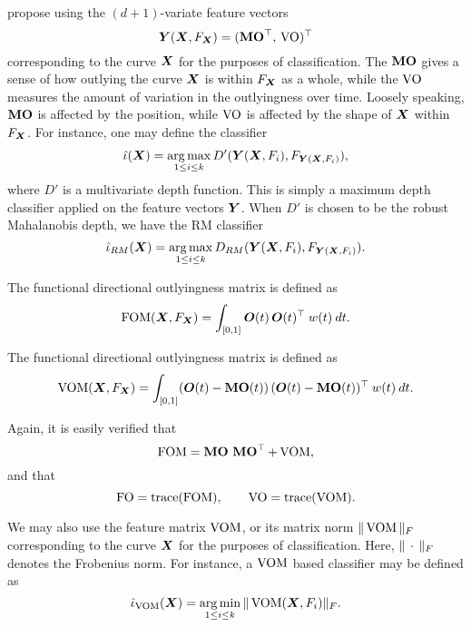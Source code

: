 \textcite{dai-genton-2018} propose using the $(d + 1)$-variate feature vectors
\begin{equation}
    \bm{Y}(\bm{X}, F_{\bm{X}}) = (\operatorname{\textbf{MO}}^\top,\, \operatorname{VO})^\top
\end{equation}
corresponding to the curve $\bm{X}$ for the purposes of classification.
The $\operatorname{\textbf{MO}}$ gives a sense of how outlying the curve $\bm{X}$ is within $F_{\bm{X}}$ as
a whole, while the $\operatorname{VO}$ measures the amount of variation in the outlyingness
over time.
Loosely speaking, $\operatorname{\textbf{MO}}$ is affected by the position, while $\operatorname{VO}$ is affected
by the shape of $\bm{X}$ within $F_{\bm{X}}$.
For instance, one may define the classifier
\begin{equation}
    \hat{\iota}(\bm{X}) = \operatorname*{arg\,max}_{1 \leq i \leq k} D'(\bm{Y}(\bm{X}, F_i), F_{\bm{Y}(\bm{X}, F_i)}),
\end{equation}
where $D'$ is a multivariate depth function.
This is simply a maximum depth classifier applied on the feature vectors
$\bm{Y}$.
When $D'$ is chosen to be the robust Mahalanobis depth, we have the RM
classifier
\begin{equation}
    \hat{\iota}_{RM}(\bm{X}) = \operatorname*{arg\,max}_{1 \leq i \leq k} D_{RM}(\bm{Y}(\bm{X}, F_i), F_{\bm{Y}(\bm{X}, F_i)}).
\end{equation}


\begin{definition}
    The functional directional outlyingness matrix is defined as
    \begin{equation}
        \operatorname{FOM}(\bm{X}, F_{\bm{X}}) = \int_{[0, 1]} \bm{O}(t)\,\bm{O}(t)^\top \:w(t)\:dt.
    \end{equation}
\end{definition}

\begin{definition}
    The functional directional outlyingness matrix is defined as
    \begin{equation}
        \operatorname{VOM}(\bm{X}, F_{\bm{X}}) = \int_{[0, 1]} (\bm{O}(t) - \operatorname{\textbf{MO}}(t))\,(\bm{O}(t) - \operatorname{\textbf{MO}}(t))^\top \:w(t)\:dt.
    \end{equation}
\end{definition}

Again, it is easily verified that
\begin{equation}
    \operatorname{FOM} = \operatorname{\textbf{MO}}\,\operatorname{\textbf{MO}}^\top + \operatorname{VOM},
\end{equation}
and that
\begin{equation}
    \operatorname{FO} = \operatorname{trace}(\operatorname{FOM}), \qquad
    \operatorname{VO} = \operatorname{trace}(\operatorname{VOM}).
\end{equation}

We may also use the feature matrix $\operatorname{VOM}$, or its matrix norm $\Vert \operatorname{VOM} \Vert_F$
corresponding to the curve $\bm{X}$ for the purposes of classification.
Here, $\Vert \,\cdot\, \Vert_F$ denotes the Frobenius norm.
For instance, a $\operatorname{VOM}$ based classifier may be defined as
\begin{equation}
    \hat{\iota}_{\operatorname{VOM}}(\bm{X}) = \operatorname*{arg\,min}_{1 \leq i \leq k} \Vert \operatorname{VOM}(\bm{X}, F_i) \Vert_F.
\end{equation}



